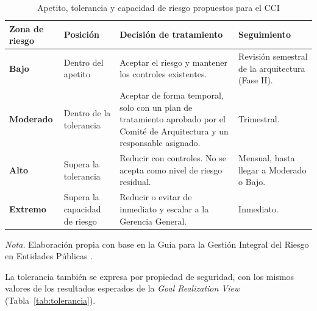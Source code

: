 \begin{table}[H]
	\caption{Apetito, tolerancia y capacidad de riesgo propuestos para el CCI}
	\label{tab:apetito}
	\centering
	\footnotesize
	\renewcommand{\arraystretch}{1.15}
	\begin{tabularx}{\textwidth}{@{}>{\raggedright\arraybackslash}p{} Y Y Y@{}}
		\toprule
		\textbf{Zona de riesgo} & \textbf{Posición} & \textbf{Decisión de tratamiento} & \textbf{Seguimiento} \\
		\midrule
		\textbf{Bajo}
		& Dentro del apetito
		& Aceptar el riesgo y mantener los controles existentes.
		& Revisión semestral de la arquitectura (Fase H).
		\\
		\midrule
		\textbf{Moderado}
		& Dentro de la tolerancia
		& Aceptar de forma temporal, solo con un plan de tratamiento aprobado por el Comité de Arquitectura y un responsable asignado.
		& Trimestral.
		\\
		\midrule
		\textbf{Alto}
		& Supera la tolerancia
		& Reducir con controles. No se acepta como nivel de riesgo residual.
		& Mensual, hasta llegar a Moderado o Bajo.
		\\
		\midrule
		\textbf{Extremo}
		& Supera la capacidad de riesgo
		& Reducir o evitar de inmediato y escalar a la Gerencia General.
		& Inmediato.
		\\
		\bottomrule
	\end{tabularx}

	\vspace{0.4em}
	\parbox{\textwidth}{\footnotesize \textit{Nota.} Elaboración propia con base en la Guía para la Gestión Integral del Riesgo en Entidades Públicas \parencite{funcionpublica2025}.}
\end{table}

La tolerancia también se expresa por propiedad de seguridad, con los mismos valores de los resultados esperados de la \textit{Goal Realization View} (Tabla~\ref{tab:tolerancia}).

